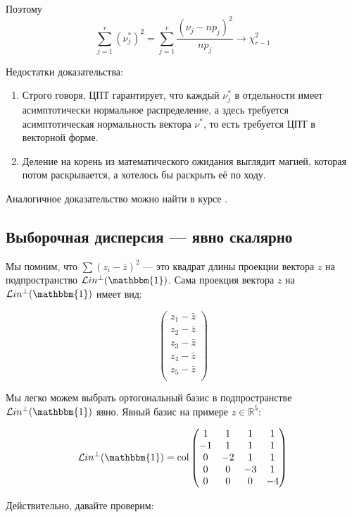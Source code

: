 \documentclass[11pt,russian,]{article}
\newcommand{\RR}{\mathbb{R}}
\newcommand{\1}{\mathbbm{1}}
\newcommand{\Lin}{\mathcal{L}in}
\newcommand{\Linp}{\Lin^{\perp}}
\newcommand{\col}{\mathcal{col}}
\renewcommand{\col}{\mathrm{col}}
\begin{document}
Поэтому \[
\sum_{j=1}^r (\nu_j^*)^2 = \sum_{j=1}^r \frac{(\nu_j - np_j)^2}{np_j} \to \chi^2_{r-1}
\]

Недостатки доказательства:

\begin{enumerate}
\def\labelenumi{\arabic{enumi}.}
\item
  Строго говоря, ЦПТ гарантирует, что каждый \(\nu_j^*\) в отдельности
  имеет асимптотически нормальное распределение, а здесь требуется
  асимптотическая нормальность вектора \(\nu^*\), то есть требуется ЦПТ
  в векторной форме.
\item
  Деление на корень из математического ожидания выглядит магией, которая
  потом раскрывается, а хотелось бы раскрыть её по ходу.
\end{enumerate}

Аналогичное доказательство можно найти в курсе
\textcite{panchenko2005statistics}.

\subsection{Выборочная дисперсия --- явно скалярно}\label{---}

Мы помним, что \(\sum (z_i - \bar z)^2\) --- это квадрат длины проекции
вектора \(z\) на подпространство \(\Linp (\1)\). Сама проекция вектора
\(z\) на \(\Linp (\1)\) имеет вид:

\[
\begin{pmatrix}
z_1 - \bar z \\
z_2 - \bar z \\
z_3 - \bar z \\
z_4 - \bar z \\
z_5 - \bar z \\
\end{pmatrix} 
\]

Мы легко можем выбрать ортогональный базис в подпространстве
\(\Linp (\1)\) явно. Явный базис на примере \(z \in \RR^{5}\):

\[
\Linp (\1) = \col \begin{pmatrix}
1  & 1  & 1  & 1  \\ 
-1 & 1  & 1  & 1  \\
0  & -2 & 1  & 1  \\
0  & 0  & -3 & 1  \\
0  & 0  & 0  & -4  \\
\end{pmatrix}
\]

Действительно, давайте проверим:
\end{document}
